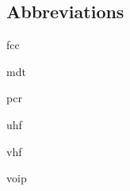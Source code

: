 \documentclass[../../EMT-169.tex]{subfiles}
\begin{document}
\subsection*{Abbreviations}
\begin{description}[leftmargin=!,labelwidth=\widthof{\bfseries ABCDE}]
	\item [\acrshort{fcc}] 		\acrlong{fcc}
	\item [\acrshort{mdt}] 		\acrlong{mdt}
	\item [\acrshort{pcr}] 		\acrlong{pcr}
	\item [\acrshort{uhf}] 		\acrlong{uhf}
	\item [\acrshort{vhf}] 		\acrlong{vhf}
	\item [\acrshort{voip}] 	\acrlong{voip}
\end{description}
\end{document}

